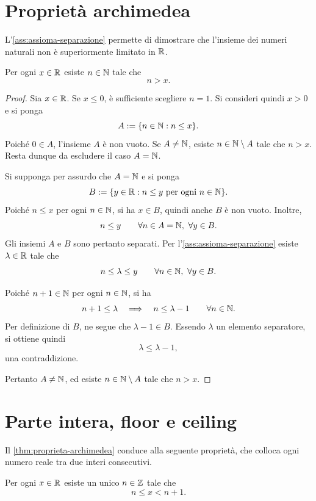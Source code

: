 \clearpage

\section{Proprietà archimedea}
\label{sec:lez03-proprieta-archimedea}

L'\cref{ass:assioma-separazione}
permette di dimostrare che l'insieme dei numeri naturali non è
superiormente limitato in \(\mathbb{R}\).

\begin{theorem}
\label{thm:proprieta-archimedea}
Per ogni \(x\in\mathbb{R}\) esiste \(n\in\mathbb{N}\) tale che
\[
  n>x.
\]
\end{theorem}

\begin{proof}
Sia \(x\in\mathbb{R}\). Se \(x\le0\), è sufficiente scegliere
\(n=1\). Si consideri quindi \(x>0\) e si ponga
\[
  A:=\{n\in\mathbb{N}:n\le x\}.
\]
Poiché \(0\in A\), l'insieme \(A\) è non vuoto.
Se \(A\ne\mathbb{N}\), esiste \(n\in\mathbb{N}\setminus A\) tale che
\(n>x\). Resta dunque da escludere il caso \(A=\mathbb{N}\).

Si supponga per assurdo che \(A=\mathbb{N}\) e si ponga
\[
  B:=\{y\in\mathbb{R}:n\le y\ \text{per ogni }n\in\mathbb{N}\}.
\]
Poiché \(n\le x\) per ogni \(n\in\mathbb{N}\), si ha \(x\in B\),
quindi anche \(B\) è non vuoto. Inoltre,
\[
  n\le y
  \qquad\forall n\in A=\mathbb{N},\ \forall y\in B.
\]
Gli insiemi \(A\) e \(B\) sono pertanto separati.
Per l'\cref{ass:assioma-separazione}
esiste \(\lambda\in\mathbb{R}\) tale che
\[
  n\le\lambda\le y
  \qquad\forall n\in\mathbb{N},\ \forall y\in B.
\]

Poiché \(n+1\in\mathbb{N}\) per ogni \(n\in\mathbb{N}\), si ha
\[
  n+1\le\lambda
  \quad\Longrightarrow\quad
  n\le\lambda-1
  \qquad\forall n\in\mathbb{N}.
\]
Per definizione di \(B\), ne segue che \(\lambda-1\in B\).
Essendo \(\lambda\) un elemento separatore, si ottiene quindi
\[
  \lambda\le\lambda-1,
\]
una contraddizione.

Pertanto \(A\ne\mathbb{N}\), ed esiste \(n\in\mathbb{N}\setminus A\)
tale che \(n>x\).
\end{proof}

\section{Parte intera, floor e ceiling}
\label{sec:lez03-parte-intera}

Il \cref{thm:proprieta-archimedea} conduce alla seguente
proprietà, che colloca ogni numero reale tra due interi
consecutivi.

\begin{proposition}
\label{prop:parte-intera}
Per ogni \(x\in\mathbb{R}\) esiste un unico \(n\in\mathbb{Z}\) tale che
\[
  n\le x<n+1.
\]
\end{proposition}

